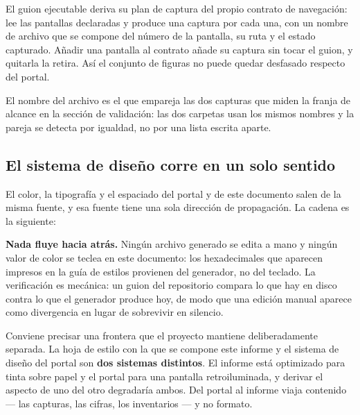 El guion ejecutable deriva su plan de captura del propio contrato de navegación: lee las pantallas
declaradas y produce una captura por cada una, con un nombre de archivo que se compone del número de
la pantalla, su ruta y el estado capturado. Añadir una pantalla al contrato añade su captura sin
tocar el guion, y quitarla la retira. Así el conjunto de figuras no puede quedar desfasado respecto
del portal.

El nombre del archivo es el que empareja las dos capturas que miden la franja de alcance en la
sección de validación: las dos carpetas usan los mismos nombres y la pareja se detecta por igualdad,
no por una lista escrita aparte.

\subsection{El sistema de diseño corre en un solo sentido}

El color, la tipografía y el espaciado del portal y de este documento salen de la misma fuente, y esa
fuente tiene una sola dirección de propagación. La cadena es la siguiente:

\begin{uxlist}
\end{uxlist}

\textbf{Nada fluye hacia atrás.} Ningún archivo generado se edita a mano y ningún valor de color se
teclea en este documento: los hexadecimales que aparecen impresos en la guía de estilos provienen del
generador, no del teclado. La verificación es mecánica: un guion del repositorio compara lo que hay
en disco contra lo que el generador produce hoy, de modo que una edición manual aparece como
divergencia en lugar de sobrevivir en silencio.

Conviene precisar una frontera que el proyecto mantiene deliberadamente separada. La hoja de estilo
con la que se compone este informe y el sistema de diseño del portal son \textbf{dos sistemas
distintos}. El informe está optimizado para tinta sobre papel y el portal para una pantalla
retroiluminada, y derivar el aspecto de uno del otro degradaría ambos. Del portal al informe viaja
contenido --- las capturas, las cifras, los inventarios --- y no formato.

